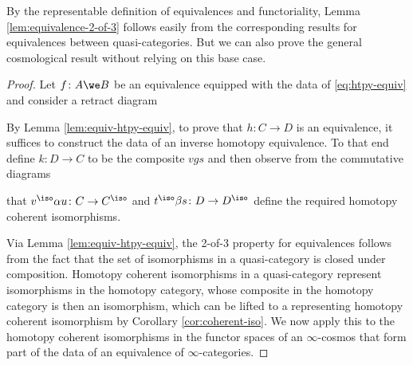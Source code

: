 By the representable definition of equivalences and functoriality, Lemma \ref{lem:equivalence-2-of-3} follows easily from the corresponding results for equivalences between quasi-categories.
  But we can also prove the general cosmological result without relying on this base case.


\begin{proof}
Let $f \colon A \we B$ be an equivalence equipped with the data of  \eqref{eq:htpy-equiv} and consider a retract diagram
\begin{center}
\end{center}
By Lemma \ref{lem:equiv-htpy-equiv}, to prove that $h \colon C \to D$ is an equivalence, it suffices to construct the data of an inverse homotopy equivalence. To that end define $k \colon D \to C$ to be the composite $vgs$ and then observe from the commutative diagrams
\begin{center}
\end{center}
that $v^\iso \alpha u \colon C \to C^\iso$ and $t^\iso \beta s \colon D \to D^\iso$ define the required homotopy coherent isomorphisms.

Via Lemma \ref{lem:equiv-htpy-equiv}, the 2-of-3 property for equivalences follows from the fact that the set of  isomorphisms in a quasi-category is closed under composition. Homotopy coherent isomorphisms in a quasi-category represent isomorphisms in the homotopy category, whose composite in the homotopy category is then an isomorphism, which can be lifted to a representing homotopy coherent isomorphism by Corollary \ref{cor:coherent-iso}. We now apply this to the homotopy coherent isomorphisms in the functor spaces of an $\infty$-cosmos that form part of the data of an equivalence of $\infty$-categories.


\end{proof}
